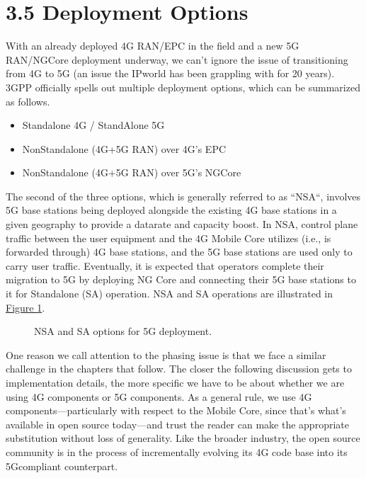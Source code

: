 \documentclass[a4paper,11pt,english]{sphinxmanual}
\let\sphinxpxdimen\pdfpxdimen\else\newdimen\sphinxpxdimen
\begin{document}
\section{3.5 Deployment Options}
\label{\detokenize{arch:deployment-options}}
\sphinxAtStartPar
With an already deployed 4G RAN/EPC in the field and a new 5G
RAN/NG\sphinxhyphen{}Core deployment underway, we can’t ignore the issue of
transitioning from 4G to 5G (an issue the IP\sphinxhyphen{}world has been grappling
with for 20 years). 3GPP officially spells out multiple deployment
options, which can be summarized as follows.
\begin{itemize}
\item {} 
\sphinxAtStartPar
Standalone 4G / Stand\sphinxhyphen{}Alone 5G

\item {} 
\sphinxAtStartPar
Non\sphinxhyphen{}Standalone (4G+5G RAN) over 4G’s EPC

\item {} 
\sphinxAtStartPar
Non\sphinxhyphen{}Standalone (4G+5G RAN) over 5G’s NG\sphinxhyphen{}Core

\end{itemize}

\sphinxAtStartPar
The second of the three options, which is generally referred to as
“NSA“, involves 5G base stations being deployed alongside the
existing 4G base stations in a given geography to provide a data\sphinxhyphen{}rate
and capacity boost. In NSA, control plane traffic between the user
equipment and the 4G Mobile Core utilizes (i.e., is forwarded through)
4G base stations, and the 5G base stations are used only to carry user
traffic. Eventually, it is expected that operators complete their
migration to 5G by deploying NG Core and connecting their 5G base
stations to it for Standalone (SA) operation. NSA and SA operations
are illustrated in \hyperref[\detokenize{arch:fig-nsa}]{Figure \ref{\detokenize{arch:fig-nsa}}}.

\begin{figure}[ht]
\centering
\capstart

\noindent\sphinxincludegraphics[width=600\sphinxpxdimen]{{Slide38}.png}
\caption{NSA and SA options for 5G deployment.}\label{\detokenize{arch:id14}}\label{\detokenize{arch:fig-nsa}}\end{figure}

\sphinxAtStartPar
One reason we call attention to the phasing issue is that we face a
similar challenge in the chapters that follow. The closer the following
discussion gets to implementation details, the more specific we have to
be about whether we are using 4G components or 5G components. As a
general rule, we use 4G components—particularly with respect to the
Mobile Core, since that’s what’s available in open source today—and trust
the reader can make the appropriate substitution without loss of
generality. Like the broader industry, the open source community is in
the process of incrementally evolving its 4G code base into its
5G\sphinxhyphen{}compliant counterpart.
\end{document}
